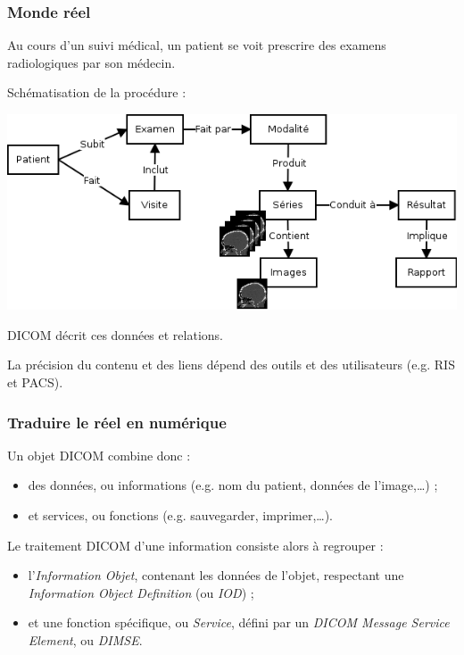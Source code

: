 	\frame
	{
		\frametitle{Monde r\'eel}
		Au cours d'un suivi m\'edical, un patient se voit prescrire des examens radiologiques par son m\'edecin.
		
		Sch\'ematisation de la proc\'edure :
		
		\includegraphics[width=\linewidth]{./figures/scenario.png}
		
		DICOM d\'ecrit ces donn\'ees et relations.
		
		La pr\'ecision du contenu et des liens d\'epend des outils et des utilisateurs (e.g. RIS et PACS).
	}

	\frame
	{
		\frametitle{Traduire le r\'eel en num\'erique}
		
		Un objet DICOM combine donc :
		\begin{itemize}
			\item<2-> des donn\'ees, ou informations (e.g. nom du patient, donn\'ees de l'image,\ldots) ;
			\item<3-> et services, ou fonctions (e.g. sauvegarder, imprimer,\ldots).
		\end{itemize}
		
		Le traitement DICOM d'une information consiste alors \`a regrouper :
		\begin{itemize}
			\item<4-> l'\emph{Information Objet}, contenant les donn\'ees de l'objet, respectant une \emph{Information Object Definition} (ou \emph{IOD}) ;
			\item<5-> et une fonction sp\'ecifique, ou \emph{Service}, d\'efini par un \emph{DICOM Message Service Element}, ou \emph{DIMSE}.
		\end{itemize}
	}
	

